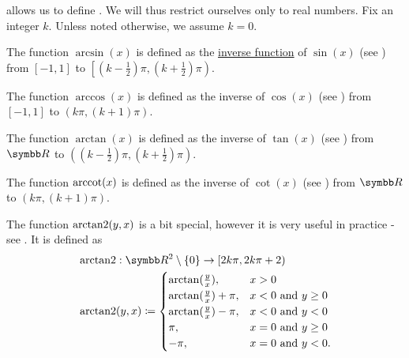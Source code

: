\begin{definition}\label{def:inverse_trigonometric_functions}
   allows us to define . We will thus restrict ourselves only to real numbers. Fix an integer \( k \). Unless noted otherwise, we assume \( k = 0 \).

  \begin{defenum}
     The  function \( \arcsin(x) \) is defined as the \hyperref[def:function/inverse]{inverse function} of \( \sin(x) \) (see ) from \( [-1, 1] \) to \( \left[(k - \tfrac 1 2) \pi, (k + \tfrac 1 2) \pi \right) \).

     The  function \( \arccos(x) \) is defined as the inverse of \( \cos(x) \) (see ) from \( [-1, 1] \) to \( (k\pi, (k + 1)\pi) \).

     The  function \( \arctan(x) \) is defined as the inverse of \( \tan(x) \) (see ) from \( \BR \) to \( \left((k - \tfrac 1 2) \pi, (k + \tfrac 1 2) \pi \right) \).

     The  function \( \operatorname{arccot}(x) \) is defined as the inverse of \( \cot(x) \) (see ) from \( \BR \) to \( (k\pi, (k + 1)\pi) \).

     The  function \( \operatorname{arctan2}(y, x) \) is a bit special, however it is very useful in practice - see . It is defined as
    \begin{align*}
      &\arctantwo: \BR^2 \setminus \{ 0 \} \to [2k\pi, 2k\pi + 2) \\
      &\arctantwo(y, x) \coloneqq \begin{cases}
        \arctan(\tfrac y x),       &x > 0 \\
        \arctan(\tfrac y x) + \pi, &x < 0 \Tand y \geq 0 \\
        \arctan(\tfrac y x) - \pi, &x < 0 \Tand y < 0 \\
        \pi,                       &x = 0 \Tand y \geq 0 \\
        -\pi,                      &x = 0 \Tand y < 0.
      \end{cases}
    \end{align*}
  \end{defenum}
\end{definition}

